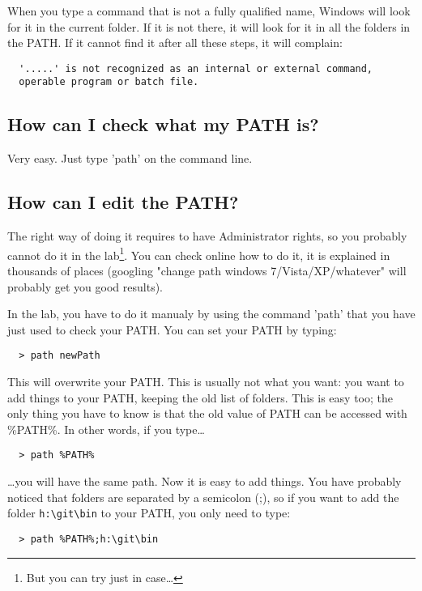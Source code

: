 \documentclass{article}
\begin{document}
When you type a command that is not a fully qualified name, Windows
will look for it in the current folder. If it is not there, it will
look for it in all the folders in the PATH. If it cannot find it after
all these steps, it will complain:

\begin{verbatim}
  '.....' is not recognized as an internal or external command,
  operable program or batch file.
\end{verbatim}

\subsection{How can I check what my PATH is?}

Very easy. Just type 'path' on the command line.

\subsection{How can I edit the PATH?}

The right way of doing it requires to have Administrator rights, so
you probably cannot do it in the lab\footnote{But you can try just in
  case\ldots}.  
You can check online how to do it, it is
explained in thousands of places (googling "change path windows
7/Vista/XP/whatever" will probably get you good results).

In the lab, you have to do it manualy by using the command 'path' that
you have 
just used to check your PATH. You can set your PATH by typing:

\begin{verbatim}
  > path newPath
\end{verbatim}


This will overwrite your PATH. This is usually not what you want: you
want to add things to your PATH, keeping the old list of folders. This
is easy too; the only thing you have to know is that the old value of
PATH can be accessed with \%PATH\%. In other words, if you type\ldots

\begin{verbatim}
  > path %PATH%
\end{verbatim}

\ldots you will have the same path. Now it is easy to add things. You
have probably noticed that folders are separated by a semicolon (;),
so if you want to add the folder \verb+h:\git\bin+ to your PATH, you
only 
need to type:

\begin{verbatim}
  > path %PATH%;h:\git\bin
\end{verbatim}
\end{document}
